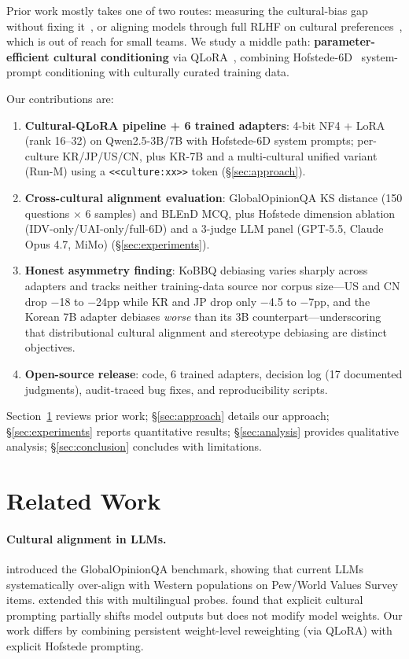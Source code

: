 \documentclass{article}
\begin{document}
Prior work mostly takes one of two routes: measuring the cultural-bias gap without fixing it~\cite{durmus2023global,myung2024blend,shi2024culturebank}, or aligning models through full RLHF on cultural preferences~\cite{li2024culturellm,alkhamissi2024investigating}, which is out of reach for small teams. We study a middle path: \textbf{parameter-efficient cultural conditioning} via QLoRA~\cite{dettmers2023qlora}, combining Hofstede-6D~\cite{hofstede2010cultures} system-prompt conditioning with culturally curated training data.

Our contributions are:
\begin{enumerate}
    \item \textbf{Cultural-QLoRA pipeline + 6 trained adapters}: 4-bit NF4 + LoRA (rank 16--32) on Qwen2.5-3B/7B with Hofstede-6D system prompts; per-culture KR/JP/US/CN, plus KR-7B and a multi-cultural unified variant (Run-M) using a \verb|<<culture:xx>>| token (\S\ref{sec:approach}).
    \item \textbf{Cross-cultural alignment evaluation}: GlobalOpinionQA KS distance (150 questions $\times$ 6 samples) and BLEnD MCQ, plus Hofstede dimension ablation (IDV-only/UAI-only/full-6D) and a 3-judge LLM panel (GPT-5.5, Claude Opus 4.7, MiMo) (\S\ref{sec:experiments}).
    \item \textbf{Honest asymmetry finding}: KoBBQ debiasing varies sharply across adapters and tracks neither training-data source nor corpus size---US and CN drop $-$18 to $-$24pp while KR and JP drop only $-$4.5 to $-$7pp, and the Korean 7B adapter debiases \emph{worse} than its 3B counterpart---underscoring that distributional cultural alignment and stereotype debiasing are distinct objectives.
    \item \textbf{Open-source release}: code, 6 trained adapters, decision log (17 documented judgments), audit-traced bug fixes, and reproducibility scripts.
\end{enumerate}

Section~\ref{sec:related} reviews prior work; \S\ref{sec:approach} details our approach; \S\ref{sec:experiments} reports quantitative results; \S\ref{sec:analysis} provides qualitative analysis; \S\ref{sec:conclusion} concludes with limitations.

\section{Related Work}
\label{sec:related}

\paragraph{Cultural alignment in LLMs.}
\citet{durmus2023global} introduced the GlobalOpinionQA benchmark, showing that current LLMs systematically over-align with Western populations on Pew/World Values Survey items. \citet{cao2023assessing} extended this with multilingual probes. \citet{alkhamissi2024investigating} found that explicit cultural prompting partially shifts model outputs but does not modify model weights. Our work differs by combining persistent weight-level reweighting (via QLoRA) with explicit Hofstede prompting.
\end{document}
